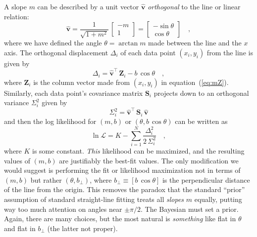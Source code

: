 \documentclass[12pt,twoside]{article}
\newcommand{\equationname}{equation}
\newcommand{\mmatrix}[1]{\boldsymbol{#1}}
\newcommand{\transpose}[1]{{#1}^{\scriptscriptstyle \top}}
\newcommand{\mS}{\mmatrix{S}}
\newcommand{\mZ}{\mmatrix{Z}}
\newcommand{\vhat}{\mmatrix{\hat{v}}}
\newcommand{\like}{\mathscr{L}}
\newcommand{\bperp}{b_{\perp}}
\begin{document}
A slope $m$ can be described by a unit vector $\vhat$
\emph{orthogonal} to the line or linear relation:
\begin{equation}
\vhat
 = \frac{1}{\sqrt{1+m^2}}\,\left[\begin{array}{c}-m\\1\end{array}\right]
 = \left[\begin{array}{c}-\sin\theta\\\cos\theta\end{array}\right] \quad ,
\end{equation}
where we have defined the angle $\theta = \arctan m$ made between the
line and the $x$ axis.  The orthogonal displacement $\Delta_i$ of each
data point $(x_i,y_i)$ from the line is given by
\begin{equation}
\Delta_i = \transpose{\vhat}\,\mZ_i - b\,\cos\theta \quad ,
\end{equation}
where $\mZ_i$ is the column vector made from $(x_i,y_i)$ in
\equationname~(\ref{eq:mZ}).  Similarly, each data point's covariance
matrix $\mS_i$ projects down to an orthogonal variance $\Sigma_i^2$ given by
\begin{equation}\label{eq:Sigma}
\Sigma_i^2 = \transpose{\vhat}\,\mS_i\,\vhat
\end{equation}
and then the log likelihood for $(m,b)$ or $(\theta,b\,\cos\theta)$
can be written as
\begin{equation}\label{eq:twodlike}
\ln\like = K - \sum_{i=1}^N \frac{\Delta_i^2}{2\,\Sigma_{i}^2} \quad ,
\end{equation}
where $K$ is some constant.  \emph{This} likelihood can be maximized,
and the resulting values of $(m,b)$ are justifiably the best-fit
values.  The only modification we would suggest is performing the fit
or likelihood maximization not in terms of $(m,b)$ but rather
$(\theta,\bperp)$, where $\bperp\equiv[b\,\cos\theta]$ is the
perpendicular distance of the line from the origin.  This removes the
paradox that the standard ``prior'' assumption of standard
straight-line fitting treats all \emph{slopes} $m$ equally, putting
way too much attention on angles near $\pm\pi/2$.  The Bayesian must
set a prior.  Again, there are many choices, but the most natural
is \emph{something} like flat in $\theta$ and flat in $\bperp$ (the
latter not proper).
\end{document}
